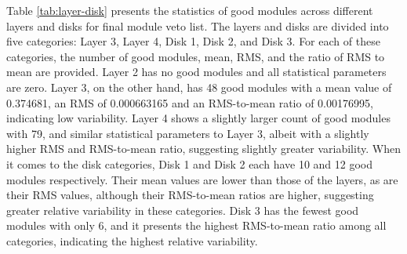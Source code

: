 
Table \ref{tab:layer-disk} presents the statistics of good modules across different layers and disks for final module veto list. The layers and disks are divided into five categories: Layer 3, Layer 4, Disk 1, Disk 2, and Disk 3. For each of these categories, the number of good modules, mean, RMS, and the ratio of RMS to mean are provided. Layer 2 has no good modules and all statistical parameters are zero. Layer 3, on the other hand, has 48 good modules with a mean value of 0.374681, an RMS of 0.000663165 and an RMS-to-mean ratio of 0.00176995, indicating low variability. Layer 4 shows a slightly larger count of good modules with 79, and similar statistical parameters to Layer 3, albeit with a slightly higher RMS and RMS-to-mean ratio, suggesting slightly greater variability. When it comes to the disk categories, Disk 1 and Disk 2 each have 10 and 12 good modules respectively. Their mean values are lower than those of the layers, as are their RMS values, although their RMS-to-mean ratios are higher, suggesting greater relative variability in these categories. Disk 3 has the fewest good modules with only 6, and it presents the highest RMS-to-mean ratio among all categories, indicating the highest relative variability. %

